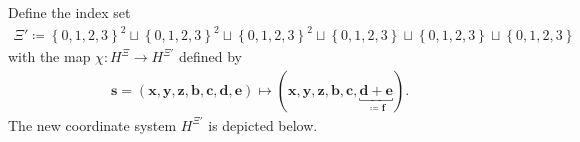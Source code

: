 \begin{definition}
    Define the index set 
    \begin{align*}
        \Xi' \coloneqq \left\{ 0,1,2,3 \right\}^2 \sqcup \left\{ 0,1,2,3 \right\}^2 \sqcup \left\{ 0,1,2,3 \right\}^2 \sqcup \left\{ 0,1,2,3 \right\} \sqcup \left\{ 0,1,2,3 \right\} \sqcup \left\{ 0,1,2,3 \right\} 
    \end{align*}
    with the map \( \chi: H^\Xi \to H^{\Xi'}\) defined by 
    \begin{align*}
        \mathbf{s} = (\mathbf{x}, \mathbf{y}, \mathbf{z}, \mathbf{b}, \mathbf{c}, \mathbf{d}, \mathbf{e}) \mapsto (\mathbf{x}, \mathbf{y}, \mathbf{z}, \mathbf{b}, \mathbf{c}, \underbracket{\mathbf{d} + \mathbf{e}}_{\coloneqq \mathbf{f}}).
    \end{align*}
    The new coordinate system \( H^{\Xi'} \) is depicted below.


\end{definition}
